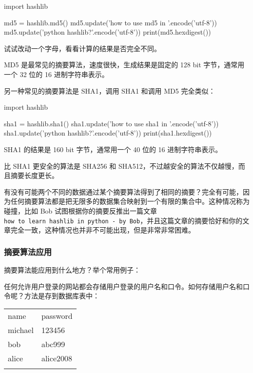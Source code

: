 \begin{pythoncode}
import hashlib

md5 = hashlib.md5()
md5.update('how to use md5 in '.encode('utf-8'))
md5.update('python hashlib?'.encode('utf-8'))
print(md5.hexdigest())
\end{pythoncode}

试试改动一个字母，看看计算的结果是否完全不同。

MD5 是最常见的摘要算法，速度很快，生成结果是固定的 128 bit
字节，通常用一个 32 位的 16 进制字符串表示。

另一种常见的摘要算法是 SHA1，调用 SHA1 和调用 MD5 完全类似：

\begin{pythoncode}
import hashlib

sha1 = hashlib.sha1()
sha1.update('how to use sha1 in '.encode('utf-8'))
sha1.update('python hashlib?'.encode('utf-8'))
print(sha1.hexdigest())
\end{pythoncode}

SHA1 的结果是 160 bit 字节，通常用一个 40 位的 16 进制字符串表示。

比 SHA1 更安全的算法是 SHA256 和
SHA512，不过越安全的算法不仅越慢，而且摘要长度更长。

有没有可能两个不同的数据通过某个摘要算法得到了相同的摘要？完全有可能，因为任何摘要算法都是把无限多的数据集合映射到一个有限的集合中。这种情况称为碰撞，比如
Bob
试图根据你的摘要反推出一篇文章\texttt{\textquotesingle{}how\ to\ learn\ hashlib\ in\ python\ -\ by\ Bob\textquotesingle{}}，并且这篇文章的摘要恰好和你的文章完全一致，这种情况也并非不可能出现，但是非常非常困难。

\hypertarget{ux6458ux8981ux7b97ux6cd5ux5e94ux7528}{%
\subsubsection{摘要算法应用}\label{ux6458ux8981ux7b97ux6cd5ux5e94ux7528}}

摘要算法能应用到什么地方？举个常用例子：

任何允许用户登录的网站都会存储用户登录的用户名和口令。如何存储用户名和口令呢？方法是存到数据库表中：

\begin{longtable}[]{@{}ll@{}}
\toprule
name & password \\ \addlinespace
\midrule
\endhead
michael & 123456 \\ \addlinespace
bob & abc999 \\ \addlinespace
alice & alice2008 \\ \addlinespace
\bottomrule
\end{longtable}

